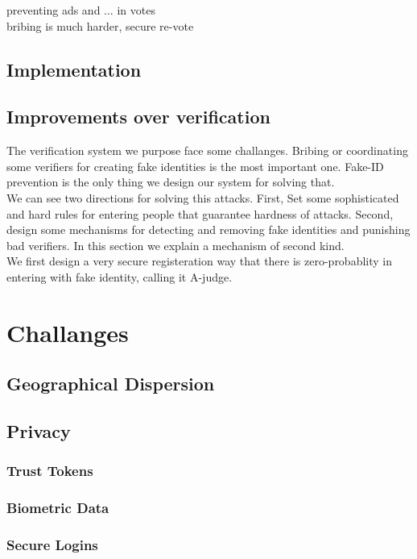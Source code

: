 \documentclass{article}
\begin{document}
preventing ads and ... in votes\\ 

bribing is much harder, secure re-vote
\subsection{Implementation}

\subsection{Improvements over verification}
The verification system we purpose face some challanges. Bribing or coordinating some verifiers for creating fake identities is the most important one. Fake-ID prevention is the only thing we design our system for solving that. \\
We can see two directions for solving this attacks. First, Set some sophisticated and hard rules for entering people that guarantee hardness of attacks. Second, design some mechanisms for detecting and removing fake identities and punishing bad verifiers. In this section we explain a mechanism of second kind. \\
We first design a very secure registeration way that there is zero-probablity in entering with fake identity, calling it A-judge. 


\section{Challanges }



\subsection{Geographical Dispersion}

\subsection{Privacy}
\subsubsection*{Trust Tokens}
\subsubsection*{Biometric Data}
\subsubsection*{Secure Logins}
\end{document}
